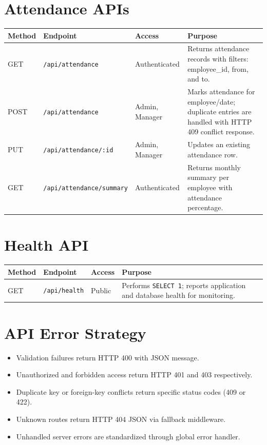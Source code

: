 \section{Attendance APIs}
\begin{longtable}{L{1.5cm}L{4.8cm}L{2.2cm}L{5.9cm}}
\toprule
\textbf{Method} & \textbf{Endpoint} & \textbf{Access} & \textbf{Purpose} \\
\midrule
\endhead
GET & \texttt{/api/attendance} & Authenticated & Returns attendance records with filters: employee\_id, from, and to. \\
POST & \texttt{/api/attendance} & Admin, Manager & Marks attendance for employee/date; duplicate entries are handled with HTTP 409 conflict response. \\
PUT & \texttt{/api/attendance/:id} & Admin, Manager & Updates an existing attendance row. \\
GET & \texttt{/api/attendance/summary} & Authenticated & Returns monthly summary per employee with attendance percentage. \\
\bottomrule
\end{longtable}

\section{Health API}
\begin{longtable}{L{1.5cm}L{4.8cm}L{2.2cm}L{5.9cm}}
\toprule
\textbf{Method} & \textbf{Endpoint} & \textbf{Access} & \textbf{Purpose} \\
\midrule
\endhead
GET & \texttt{/api/health} & Public & Performs \texttt{SELECT 1}; reports application and database health for monitoring. \\
\bottomrule
\end{longtable}
\normalsize

\section{API Error Strategy}
\begin{itemize}[leftmargin=1.3cm]
\item Validation failures return HTTP 400 with JSON message.
\item Unauthorized and forbidden access return HTTP 401 and 403 respectively.
\item Duplicate key or foreign-key conflicts return specific status codes (409 or 422).
\item Unknown routes return HTTP 404 JSON via fallback middleware.
\item Unhandled server errors are standardized through global error handler.
\end{itemize}

